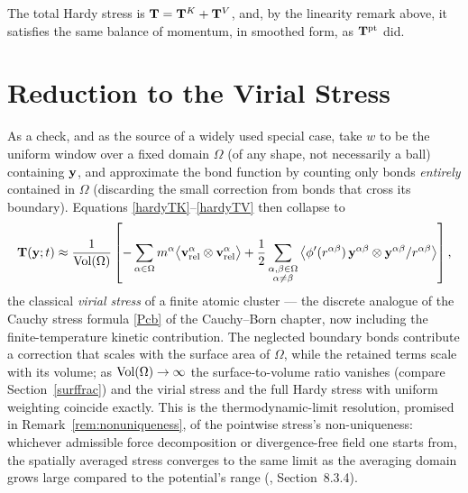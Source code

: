 The total Hardy stress is $\mathbf{T}=\mathbf{T}^K+\mathbf{T}^V$, and, by the linearity remark above, it satisfies the same balance of momentum, in smoothed form, as $\mathbf{T}^{\rm pt}$ did.

\section{Reduction to the Virial Stress}

As a check, and as the source of a widely used special case, take $w$ to be the uniform window over a fixed domain $\Omega$ (of any shape, not necessarily a ball) containing $\mathbf{y}$, and approximate the bond function by counting only bonds \textit{entirely} contained in $\Omega$ (discarding the small correction from bonds that cross its boundary). Equations \eqref{hardyTK}--\eqref{hardyTV} then collapse to
\begin{equation}\label{virial}
	\mathbf{T}(\mathbf{y};t) \approx \frac{1}{{\rm Vol}(\Omega)}\left[-\sum_{\alpha\in\Omega} m^\alpha\big\langle\mathbf{v}^\alpha_{\rm rel}\otimes\mathbf{v}^\alpha_{\rm rel}\big\rangle + \frac12\sum_{\substack{\alpha,\beta\in\Omega\\\alpha\neq\beta}}\big\langle\phi'(r^{\alpha\beta})\,\mathbf{y}^{\alpha\beta}\otimes\mathbf{y}^{\alpha\beta}/r^{\alpha\beta}\big\rangle\right],
\end{equation}
the classical \textit{virial stress} of a finite atomic cluster --- the discrete analogue of the Cauchy stress formula \eqref{Pcb} of the Cauchy--Born chapter, now including the finite-temperature kinetic contribution. The neglected boundary bonds contribute a correction that scales with the surface area of $\Omega$, while the retained terms scale with its volume; as ${\rm Vol}(\Omega)\to\infty$ the surface-to-volume ratio vanishes (compare Section~\ref{surffrac}) and the virial stress and the full Hardy stress with uniform weighting coincide exactly. This is the thermodynamic-limit resolution, promised in Remark~\ref{rem:nonuniqueness}, of the pointwise stress's non-uniqueness: whichever admissible force decomposition or divergence-free field one starts from, the spatially averaged stress converges to the same limit as the averaging domain grows large compared to the potential's range (\cite{TadmorMiller}, Section~8.3.4).


